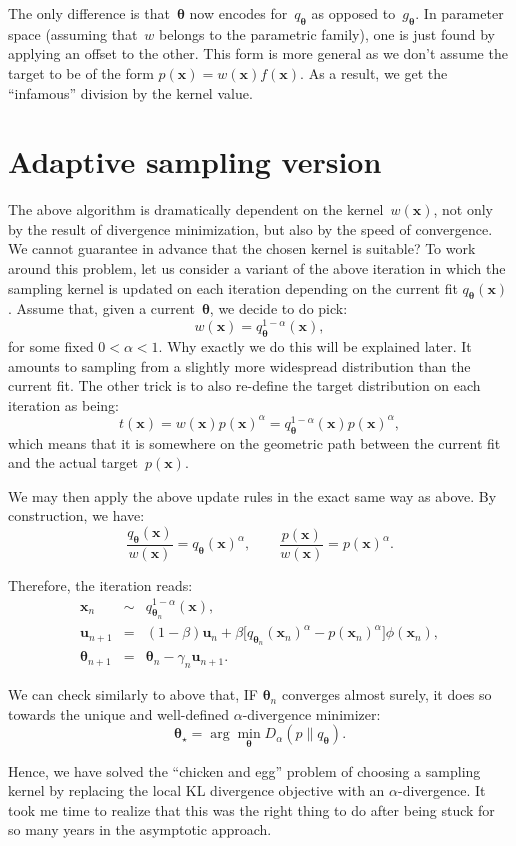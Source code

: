 \documentclass{article}
\def\x{\mathbf{x}}
\def\th{{\boldsymbol{\theta}}}
\def\u{\mathbf{u}}
\begin{document}
The only difference is that~$\th$ now encodes for~$q_\th$ as opposed to~$g_\th$. In parameter space (assuming that~$w$ belongs to the parametric family), one is just found by applying an offset to the other. This form is  more general as we don't assume the target to be of the form $p(\x)=w(\x)f(\x)$. As a result, we get the ``infamous'' division by the kernel value. 


\section{Adaptive sampling version}

The above algorithm is dramatically dependent on the kernel~$w(\x)$, not only by the result of divergence minimization, but also by the speed of convergence. We cannot guarantee in advance that the chosen kernel is suitable? To work around this problem, let us consider a variant of the above iteration in which the sampling kernel is updated on each iteration depending on the current fit $q_\th(\x)$. Assume that, given a current~$\th$, we decide to do pick:
$$
w(\x) = q_\th^{1-\alpha}(\x), 
$$
for some fixed $0<\alpha<1$. Why exactly we do this will be explained later. It amounts to sampling from a slightly more widespread distribution than the current fit. The other trick is to also re-define the target distribution on each iteration as being:
$$
t(\x) = w(\x) p(\x)^\alpha = q_\th^{1-\alpha}(\x) p(\x)^\alpha,
$$
which means that it is somewhere on the geometric path between the current fit and the actual target~$p(\x)$. 

We may then apply the above update rules in the exact same way as above. By construction, we have:
$$
\frac{q_\th(\x)}{w(\x)} = q_\th(\x)^\alpha,
\qquad
\frac{p(\x)}{w(\x)} = p(\x)^\alpha.
$$

Therefore, the iteration reads:
\begin{eqnarray*}
\x_n & \sim & q_{\th_n}^{1-\alpha}(\x),\\
\u_{n+1} & = & (1-\beta)\u_n + \beta \big[q_{\th_n}(\x_n)^\alpha - p(\x_n)^\alpha \big] \phi(\x_n),\\
\th_{n+1} & = & \th_n - \gamma_n \u_{n+1}.
\end{eqnarray*}

We can check similarly to above that, IF $\th_n$ converges almost surely, it does so towards the unique and well-defined $\alpha$-divergence minimizer:
$$
\th_\star = \arg\min_{\th} D_\alpha(p \| q_\th).
$$

Hence, we have solved the ``chicken and egg'' problem of choosing a sampling kernel by replacing the local KL divergence objective with an $\alpha$-divergence. It took me time to realize that this was the right thing to do after being stuck for so many years in the asymptotic approach.
\end{document}

